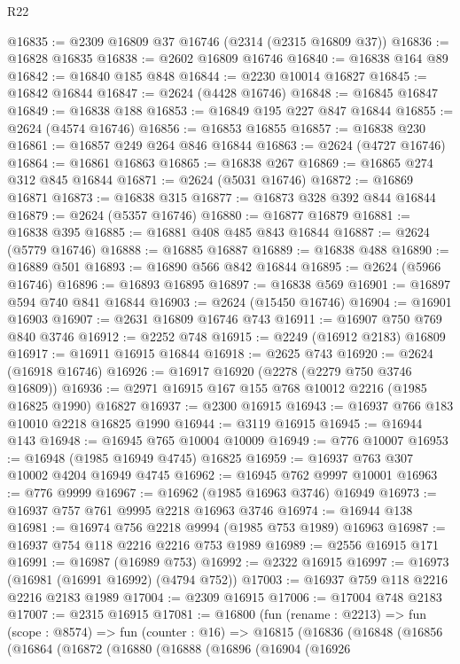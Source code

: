 \begin{lexlean}{R22}
\begin{coremodule}
@16835 := @2309 @16809 @37 @16746 (@2314 (@2315 @16809 @37))
@16836 := @16828 @16835
@16838 := @2602 @16809 @16746
@16840 := @16838 @164 @89
@16842 := @16840 @185 @848
@16844 := @2230 @10014 @16827
@16845 := @16842 @16844
@16847 := @2624 (@4428 @16746)
@16848 := @16845 @16847
@16849 := @16838 @188
@16853 := @16849 @195 @227 @847 @16844
@16855 := @2624 (@4574 @16746)
@16856 := @16853 @16855
@16857 := @16838 @230
@16861 := @16857 @249 @264 @846 @16844
@16863 := @2624 (@4727 @16746)
@16864 := @16861 @16863
@16865 := @16838 @267
@16869 := @16865 @274 @312 @845 @16844
@16871 := @2624 (@5031 @16746)
@16872 := @16869 @16871
@16873 := @16838 @315
@16877 := @16873 @328 @392 @844 @16844
@16879 := @2624 (@5357 @16746)
@16880 := @16877 @16879
@16881 := @16838 @395
@16885 := @16881 @408 @485 @843 @16844
@16887 := @2624 (@5779 @16746)
@16888 := @16885 @16887
@16889 := @16838 @488
@16890 := @16889 @501
@16893 := @16890 @566 @842 @16844
@16895 := @2624 (@5966 @16746)
@16896 := @16893 @16895
@16897 := @16838 @569
@16901 := @16897 @594 @740 @841 @16844
@16903 := @2624 (@15450 @16746)
@16904 := @16901 @16903
@16907 := @2631 @16809 @16746 @743
@16911 := @16907 @750 @769 @840 @3746
@16912 := @2252 @748
@16915 := @2249 (@16912 @2183) @16809
@16917 := @16911 @16915 @16844
@16918 := @2625 @743
@16920 := @2624 (@16918 @16746)
@16926 := @16917 @16920 (@2278 (@2279 @750 @3746 @16809))
@16936 := @2971 @16915 @167 @155 @768 @10012 @2216 (@1985 @16825 @1990) @16827
@16937 := @2300 @16915
@16943 := @16937 @766 @183 @10010 @2218 @16825 @1990
@16944 := @3119 @16915
@16945 := @16944 @143
@16948 := @16945 @765 @10004 @10009
@16949 := @776 @10007
@16953 := @16948 (@1985 @16949 @4745) @16825
@16959 := @16937 @763 @307 @10002 @4204 @16949 @4745
@16962 := @16945 @762 @9997 @10001
@16963 := @776 @9999
@16967 := @16962 (@1985 @16963 @3746) @16949
@16973 := @16937 @757 @761 @9995 @2218 @16963 @3746
@16974 := @16944 @138
@16981 := @16974 @756 @2218 @9994 (@1985 @753 @1989) @16963
@16987 := @16937 @754 @118 @2216 @2216 @753 @1989
@16989 := @2556 @16915 @171
@16991 := @16987 (@16989 @753)
@16992 := @2322 @16915
@16997 := @16973 (@16981 (@16991 @16992) (@4794 @752))
@17003 := @16937 @759 @118 @2216 @2216 @2183 @1989
@17004 := @2309 @16915
@17006 := @17004 @748 @2183
@17007 := @2315 @16915
@17081 := @16800
    (fun (rename : @2213) =>
    fun (scope : @8574) =>
    fun (counter : @16) =>
    @16815
      (@16836
        (@16848
          (@16856
            (@16864
              (@16872
                (@16880
                  (@16888
                    (@16896
                      (@16904
                        (@16926

\end{coremodule}
\end{lexlean}
